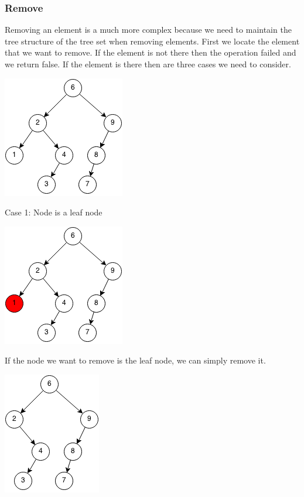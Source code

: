 \documentclass[11pt,oneside]{book}
\makeatletter
\def\maxwidth#1{\ifdim\Gin@nat@width>#1 #1\else\Gin@nat@width\fi}
\makeatother
\begin{document}
\subsubsection{Remove}

Removing an element is a much more complex because we need to maintain the tree structure of the tree set when removing elements. First we locate the element that we want to remove. If the element is not there then the operation failed and we return false. If the element is there then are three cases we need to consider.

\includegraphics[width=\maxwidth{\textwidth}]{bst-rem.png}

Case 1: Node is a leaf node

\includegraphics[width=\maxwidth{\textwidth}]{bst-rem-case11.png}

If the node we want to remove is the leaf node, we can simply remove it.

\includegraphics[width=\maxwidth{\textwidth}]{bst-rem-case12.png}
\end{document}

